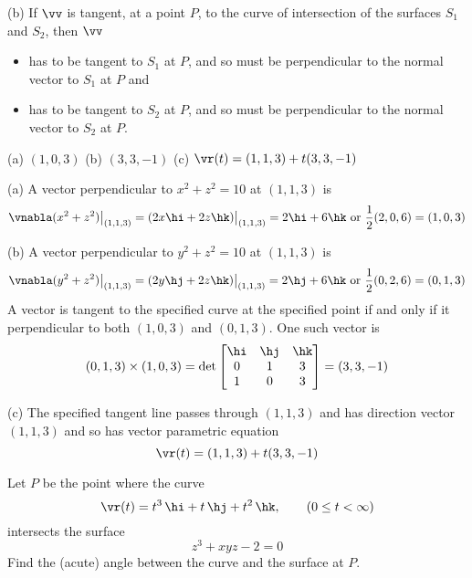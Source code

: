 \begin{hint}
(b) If $\vv$ is tangent, at a point $P$, to the curve of intersection of the
surfaces $S_1$ and $S_2$, then $\vv$ 
\begin{itemize}\itemsep1pt \parskip0pt  %
\item
has to be tangent to $S_1$ at $P$, and so must be perpendicular to the 
normal vector to $S_1$ at $P$ and
\item
has to be tangent to $S_2$ at $P$, and so must be perpendicular to the 
normal vector to $S_2$ at $P$.
\end{itemize}
\end{hint}

\begin{answer}
(a) $( 1,0,3)$\qquad
(b) $( 3,3,-1)$\qquad
(c) $\vr(t)=( 1,1,3)+t( 3,3,-1)$
\end{answer}

\begin{solution}
(a) 
A vector perpendicular to $x^2+z^2=10$ at $(1,1,3)$ is
\begin{equation*}
\vnabla(x^2+z^2)\big|_{(1,1,3)}
=(2x\hi+2z\hk)\big|_{(1,1,3)}
=2\hi+6\hk\hbox{ or }
\frac{1}{2} ( 2,0,6)=( 1,0,3)
\end{equation*}

(b) A vector perpendicular to $y^2+z^2=10$ at $(1,1,3)$ is
\begin{equation*}
\vnabla(y^2+z^2)\big|_{(1,1,3)}
=(2y\hj+2z\hk)\big|_{(1,1,3)}
=2\hj+6\hk\hbox{ or }\frac{1}{2} ( 0,2,6)=( 0,1,3)
\end{equation*}
A vector is tangent to the specified curve at the specified point if and only
if it  perpendicular to both $(1,0,3)$ and $(0,1,3)$. One such vector is
\begin{equation*}
( 0,1,3)\times(1,0,3)
=\det\left[\begin{matrix}
                     \hi & \hj & \hk \\
                     0   &  1  & 3 \\
                     1   &  0  & 3
                \end{matrix}\right]
=( 3,3,-1)
\end{equation*}

(c) The specified tangent line passes through $(1,1,3)$ and has direction
vector $( 1,1,3)$ and so has vector parametric equation
$$
\vr(t)=( 1,1,3)+t( 3,3,-1)
$$
\end{solution}

\begin{question}[M200 2000A] %
Let $P$ be the point where the curve 
\begin{equation*}
\vr(t) = t^3\,\hi + t\,\hj + t^2\,\hk,\qquad (0 \le t <\infty)
\end{equation*}
 intersects the surface 
\begin{equation*}
z^3 + xyz -2 = 0
\end{equation*}
Find the (acute) angle between the curve and the surface at $P$. 
\end{question}

